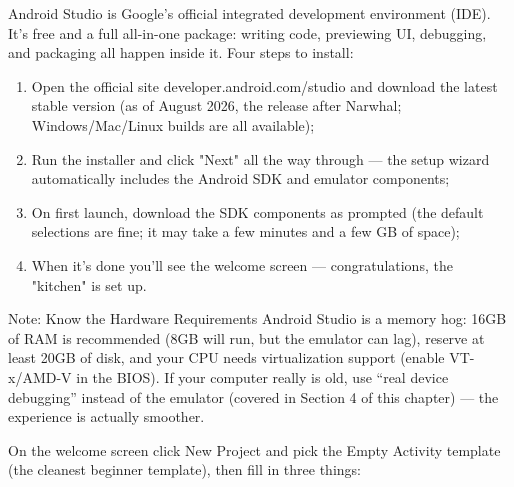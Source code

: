 


Android Studio is Google's official integrated development environment (IDE). It's free and a full all-in-one package: writing code, previewing UI, debugging, and packaging all happen inside it. Four steps to install:

\begin{enumerate}
  \item Open the official site developer.android.com/studio and download the latest stable version (as of August 2026, the release after Narwhal; Windows/Mac/Linux builds are all available);
  \item Run the installer and click "Next" all the way through — the setup wizard automatically includes the Android SDK and emulator components;
  \item On first launch, download the SDK components as prompted (the default selections are fine; it may take a few minutes and a few GB of space);
  \item When it's done you'll see the welcome screen — congratulations, the "kitchen" is set up.
\end{enumerate}

\begin{tcbwarn}{Note: Know the Hardware Requirements}
Android Studio is a memory hog: 16GB of RAM is recommended (8GB will run, but the emulator can lag), reserve at least 20GB of disk, and your CPU needs virtualization support (enable VT-x/AMD-V in the BIOS). If your computer really is old, use “real device debugging” instead of the emulator (covered in Section 4 of this chapter) — the experience is actually smoother.

\end{tcbwarn}


On the welcome screen click New Project and pick the Empty Activity template (the cleanest beginner template), then fill in three things:

